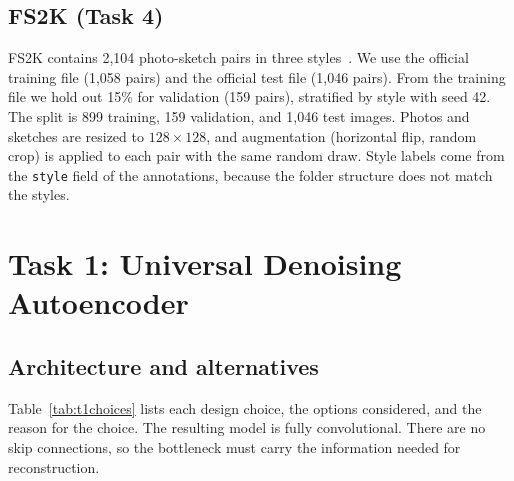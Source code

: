 \documentclass[conference]{IEEEtran}
\begin{document}
\subsection{FS2K (Task 4)}
FS2K contains 2{,}104 photo-sketch pairs in three styles~\cite{fan2021fs2k}. We use the official
training file (1{,}058 pairs) and the official test file (1{,}046 pairs). From the training file we
hold out 15\% for validation (159 pairs), stratified by style with seed 42. The split is 899
training, 159 validation, and 1{,}046 test images. Photos and sketches are resized to $128\times128$,
and augmentation (horizontal flip, random crop) is applied to each pair with the same random draw.
Style labels come from the \texttt{style} field of the annotations, because the folder structure does
not match the styles.

\section{Task 1: Universal Denoising Autoencoder}
\subsection{Architecture and alternatives}
Table~\ref{tab:t1choices} lists each design choice, the options considered, and the reason for the
choice. The resulting model is fully convolutional. There are no skip connections, so the bottleneck
must carry the information needed for reconstruction.
\end{document}
